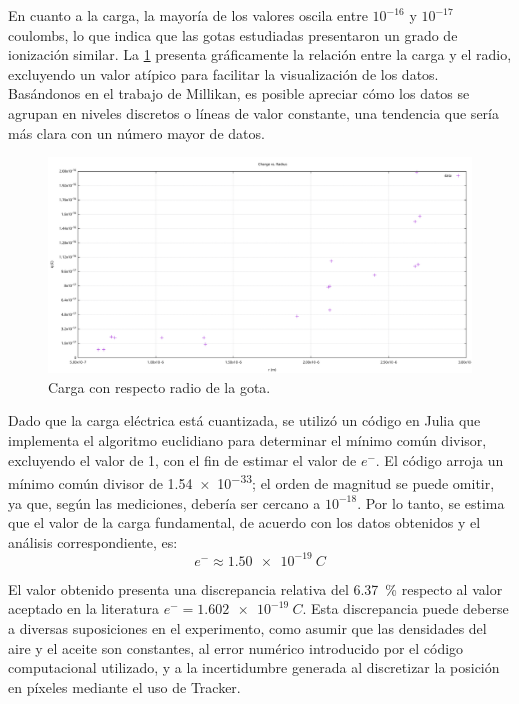 En cuanto a la carga, la mayoría de los valores oscila entre \(10^{-16}\) y
\(10^{-17}\)coulombs, lo que indica que las gotas estudiadas presentaron un
grado de ionización similar.
La \cref{fig:plot-radius-charge} presenta gráficamente la relación entre la
carga y el radio, excluyendo un valor atípico para facilitar la visualización
de los datos.
Basándonos en el trabajo de Millikan, es posible apreciar cómo los datos se
agrupan en niveles discretos o líneas de valor constante, una tendencia que
sería más clara con un número mayor de datos.

\begin{figure}[htbp!]
	\centering
	\includegraphics[width=\linewidth]{./images/plot-radius-charge.pdf}
	\caption{Carga con respecto radio de la gota.}
	\label{fig:plot-radius-charge}
\end{figure}


Dado que la carga eléctrica está cuantizada, se utilizó un código en Julia que
implementa el algoritmo euclidiano para determinar el mínimo común divisor,
excluyendo el valor de 1, con el fin de estimar el valor de \(e^{-}\).
El código arroja un mínimo común divisor de \num{1.54e-33}; el orden de magnitud
se puede omitir, ya que, según las mediciones, debería ser cercano a \(10^{-18}\).
Por lo tanto, se estima que el valor de la carga fundamental, de acuerdo con
los datos obtenidos y el análisis correspondiente, es:
\begin{equation}
	e^- \approx \qty{1.50e-19}{C}
\end{equation}

El valor obtenido presenta una discrepancia relativa del \qty{6.37}{\percent} respecto
al valor aceptado en la literatura \(e^{-} = \qty{1.602e-19}{C}\).
Esta discrepancia puede deberse a diversas suposiciones en el experimento, como
asumir que las densidades del aire y el aceite son constantes, al error numérico
introducido por el código computacional utilizado, y a la incertidumbre generada
al discretizar la posición en píxeles mediante el uso de Tracker.
